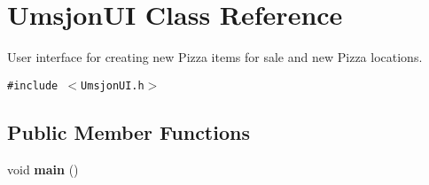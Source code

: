 \hypertarget{class_umsjon_u_i}{
\section{Umsjon\-UI Class Reference}
\label{class_umsjon_u_i}
}
User interface for creating new Pizza items for sale and new Pizza locations.  


{\tt \#include $<$Umsjon\-UI.h$>$}

\subsection*{Public Member Functions}
\begin{CompactItemize}
\item 
\hypertarget{class_umsjon_u_i_ea83b916b3f52eec32ae6d54d59b4453}{
void {\bf main} ()}
\label{class_umsjon_u_i_ea83b916b3f52eec32ae6d54d59b4453}

\end{CompactItemize}
